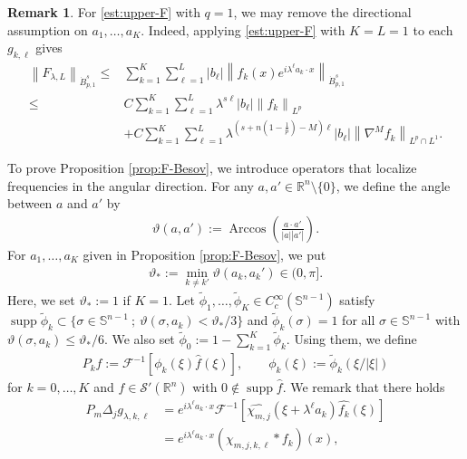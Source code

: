 \documentclass[a4paper,12pt,reqno]{amsart}
\theoremstyle{plain}
\theoremstyle{definition}
\newtheorem{rem}[thm]{Remark}
\newcommand{\dB}{\dot{B}}
\newcommand{\supp}{\operatorname{supp}}
\renewcommand{\leq}{\leqslant}
\newcommand{\n}[1]{{\left\|#1\right\|}}
\newcommand{\R}{\mathbb{R}}
\newcommand{\lp}[1]{\left[#1\right]}
\renewcommand{\sp}[1]{\left(#1\right)}
\begin{document}
\begin{rem}
    For \eqref{est:upper-F} with $q=1$, we may remove the directional assumption on $a_1,\dots,a_K$.
    Indeed, applying \eqref{est:upper-F} with $K=L=1$ to each $g_{k,\ell}$ gives
    \begin{align}
        \n{F_{\lambda,L}}_{\dB_{p,1}^s}
        \leq{}&
        \sum_{k=1}^K
        \sum_{\ell=1}^L
        |b_{\ell}|
        \n{f_k(x)e^{i\lambda^{\ell}a_k \cdot x}}_{\dB_{p,1}^s}
        \\
        \leq{}&
        C
        \sum_{k=1}^K
        \sum_{\ell=1}^L
        \lambda^{s\ell}|b_{\ell}|
        \n{f_k}_{L^p}
        \\
        &
        +
        C
        \sum_{k=1}^K
        \sum_{\ell=1}^L
        \lambda^{(s+n(1-\frac{1}{p})-M)\ell}
        |b_{\ell}|
        \n{\nabla^M f_k}_{L^p\cap L^1}.
    \end{align}
\end{rem}
To prove Proposition \ref{prop:F-Besov}, 
we introduce operators that localize frequencies in the angular direction.
For any $a,a' \in \R^n \setminus \{0\}$, 
we define the angle between $a$ and $a'$ by
\begin{align}\label{df:theta}
    \vartheta(a,a')
    :=
    \operatorname{Arccos}\sp{\frac{a\cdot a'}{|a||a'|}}.
\end{align}
For $a_1,\dots,a_K$ given in Proposition \ref{prop:F-Besov},
we put  
\begin{align}
    \vartheta_*:=\min_{k \neq k'}\vartheta\sp{a_k,a_k'} \in (0,\pi].
\end{align}
Here, we set $\vartheta_*:=1$ if $K=1$.
Let $\widetilde{\phi}_1,\dots,\widetilde{\phi}_K \in C_c^{\infty}(\mathbb{S}^{n-1})$
satisfy 
$\supp \widetilde{\phi}_k \subset \{\sigma \in \mathbb{S}^{n-1}\ ;\ \vartheta(\sigma,a_k)<\vartheta_*/3\}$ 
and 
$\widetilde{\phi}_k(\sigma)=1$ for all $\sigma \in \mathbb{S}^{n-1}$ with $\vartheta(\sigma,a_k)\leq \vartheta_*/6$.
We also set $\widetilde{\phi}_0:=1-\sum_{k=1}^K\widetilde{\phi}_k$.
Using them, we define
\begin{align}
    P_kf:=
    \mathscr{F}^{-1}
    \lp{\phi_k(\xi)\widehat{f}(\xi)},
    \qquad
    \phi_k(\xi)
    :=
    \widetilde{\phi}_k\sp{\xi/|\xi|}
\end{align}
for $k=0,\dots,K$ and $f \in \mathscr{S}'(\R^n)$ with $0 \notin \supp \widehat{f}$.
We remark that there holds
\begin{align}
    P_m\Delta_jg_{\lambda,k,\ell}
    &
    =
    e^{i\lambda^\ell a_k\cdot x}
    \mathscr{F}^{-1}
    \lp{
    \widehat{\chi_{m,j}}(\xi+\lambda^{\ell}a_k)
    \widehat{f_k}(\xi)
    }
    \\
    &=
    e^{i\lambda^\ell a_k\cdot x}
    \sp{\chi_{m,j,k,\ell}*f_k}(x),
\end{align}
\end{document}
